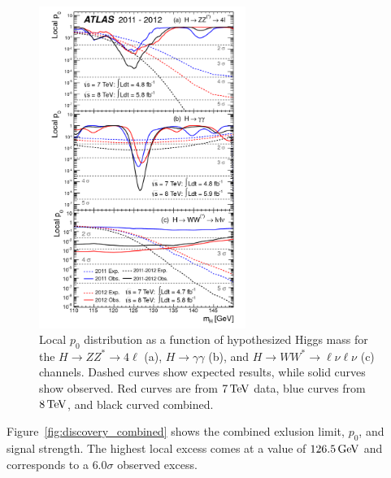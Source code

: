 \begin{figure}[h!]
  \centering
  \captionsetup{justification=centering}
  \includegraphics[width=0.6\textwidth]{figures/discovery_p0_comp}
  \caption{Local $p_0$ distribution as a function of hypothesized Higgs mass for the $H\to ZZ^* \to 4\ell$ (a), $H\to\gamma\gamma$ (b), and $H\to WW^*\to \ell\nu\ell\nu$ (c) channels. Dashed curves show expected results, while solid curves show observed. Red curves are from $7 \TeV$ data, blue curves from $8\TeV$, and black curved combined\cite{Discovery}.}
  \label{fig:disc_p0_comp}
\end{figure}

Figure~\ref{fig:discovery_combined} shows the combined exlusion limit, $p_0$, and signal strength. The highest local excess comes at a value of $126.5 \GeV$ and corresponds to a $6.0\sigma$ observed excess. 

